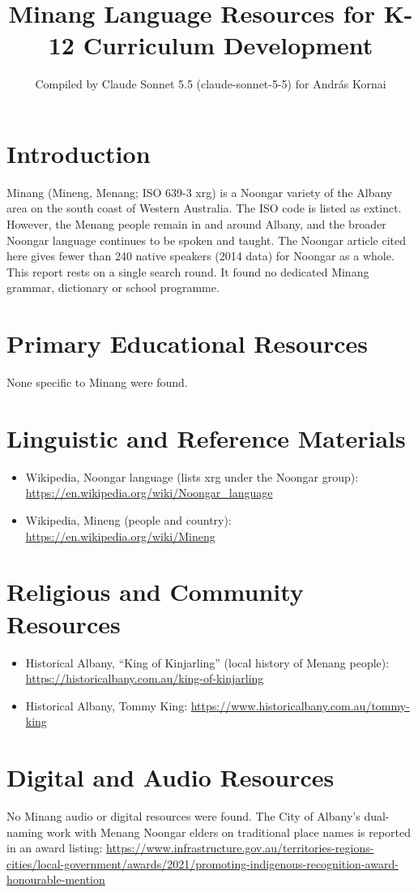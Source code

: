 \documentclass[12pt]{article}
\title{Minang Language Resources for K-12 Curriculum Development}
\author{Compiled by Claude Sonnet 5.5 (claude-sonnet-5-5) for Andr\'as Kornai}
\date{}
\begin{document}
\maketitle

\section{Introduction}
Minang (Mineng, Menang; ISO 639-3 xrg) is a Noongar variety of the Albany area on the south coast of Western Australia. The ISO code is listed as extinct. However, the Menang people remain in and around Albany, and the broader Noongar language continues to be spoken and taught. The Noongar article cited here gives fewer than 240 native speakers (2014 data) for Noongar as a whole. This report rests on a single search round. It found no dedicated Minang grammar, dictionary or school programme.

\section{Primary Educational Resources}
None specific to Minang were found.

\section{Linguistic and Reference Materials}
\begin{itemize}
\item Wikipedia, Noongar language (lists xrg under the Noongar group): \url{https://en.wikipedia.org/wiki/Noongar_language}
\item Wikipedia, Mineng (people and country): \url{https://en.wikipedia.org/wiki/Mineng}
\end{itemize}

\section{Religious and Community Resources}
\begin{itemize}
\item Historical Albany, ``King of Kinjarling'' (local history of Menang people): \url{https://historicalbany.com.au/king-of-kinjarling}
\item Historical Albany, Tommy King: \url{https://www.historicalbany.com.au/tommy-king}
\end{itemize}

\section{Digital and Audio Resources}
No Minang audio or digital resources were found. The City of Albany's dual-naming work with Menang Noongar elders on traditional place names is reported in an award listing: \url{https://www.infrastructure.gov.au/territories-regions-cities/local-government/awards/2021/promoting-indigenous-recognition-award-honourable-mention}
\end{document}

